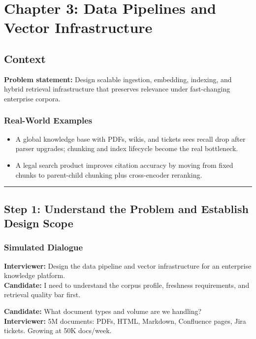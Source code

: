 \chapter{Chapter 3: Data Pipelines and Vector Infrastructure}

\section*{Context}

\textbf{Problem statement:} Design scalable ingestion, embedding, indexing, and hybrid retrieval infrastructure that preserves relevance under fast-changing enterprise corpora.

\subsection*{Real-World Examples}

\begin{itemize}
  \item A global knowledge base with PDFs, wikis, and tickets sees recall drop after parser upgrades; chunking and index lifecycle become the real bottleneck.
  \item A legal search product improves citation accuracy by moving from fixed chunks to parent-child chunking plus cross-encoder reranking.
\end{itemize}

\bigskip\hrule\bigskip

\section*{Step 1: Understand the Problem and Establish Design Scope}

\subsection*{Simulated Dialogue}

\textbf{Interviewer:} Design the data pipeline and vector infrastructure for an enterprise knowledge platform.\\
\textbf{Candidate:} I need to understand the corpus profile, freshness requirements, and retrieval quality bar first.

\textbf{Candidate:} What document types and volume are we handling?\\
\textbf{Interviewer:} 5M documents: PDFs, HTML, Markdown, Confluence pages, Jira tickets. Growing at 50K docs/week.

